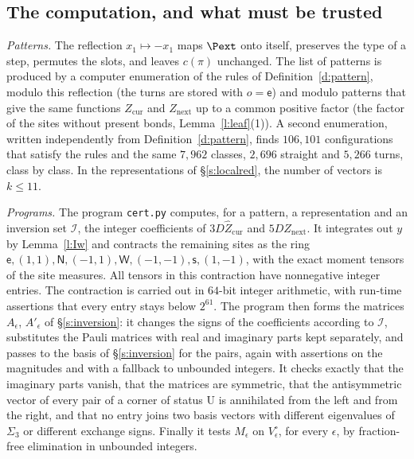 \subsection{The computation, and what must be trusted}\label{s:localcomp}

\emph{Patterns.} The reflection $x_1 \mapsto -x_1$ maps $\Pext$ onto itself, preserves the type of a step, permutes the slots, and leaves $c(\pi)$ unchanged. The list of patterns is produced by a computer enumeration of the rules of Definition~\ref{d:pattern}, modulo this reflection (the turns are stored with $o = \mathsf e$) and modulo patterns that give the same functions $Z_{\mathrm{cur}}$ and $Z_{\mathrm{next}}$ up to a common positive factor (the factor of the sites without present bonds, Lemma~\ref{l:leaf}(1)). A second enumeration, written independently from Definition~\ref{d:pattern}, finds $106{,}101$ configurations that satisfy the rules and the same $7{,}962$ classes, $2{,}696$ straight and $5{,}266$ turns, class by class. In the representations of \S\ref{s:localred}, the number of vectors is $k \le 11$.

\emph{Programs.} The program \texttt{cert.py} computes, for a pattern, a representation and an inversion set $\mathcal I$, the integer coefficients of $3 D \hat Z_{\mathrm{cur}}$ and $5 D \hat Z_{\mathrm{next}}$. It integrates out $y$ by Lemma~\ref{l:Iw} and contracts the remaining sites as the ring $\mathsf e, (1, 1), \mathsf N, (-1, 1), \mathsf W, (-1, -1), \mathsf s, (1, -1)$, with the exact moment tensors of the site measures. All tensors in this contraction have nonnegative integer entries. The contraction is carried out in $64$-bit integer arithmetic, with run-time assertions that every entry stays below $2^{61}$. The program then forms the matrices $A_\epsilon$, $A'_\epsilon$ of \S\ref{s:inversion}: it changes the signs of the coefficients according to $\mathcal I$, substitutes the Pauli matrices with real and imaginary parts kept separately, and passes to the basis of \S\ref{s:inversion} for the pairs, again with assertions on the magnitudes and with a fallback to unbounded integers. It checks exactly that the imaginary parts vanish, that the matrices are symmetric, that the antisymmetric vector of every pair of a corner of status $\mathrm U$ is annihilated from the left and from the right, and that no entry joins two basis vectors with different eigenvalues of $\Sigma_3$ or different exchange signs. Finally it tests $M_\epsilon$ on $V_\epsilon^{\circ}$, for every $\epsilon$, by fraction-free elimination in unbounded integers.

